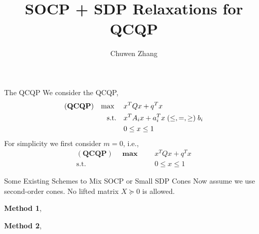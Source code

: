 \documentclass[aspectratio=1610, 10pt]{beamer}
\newcommand{\model}[1]{(\textbf{#1})}
\newcommand{\mx}{\mathbf{\max}\;}
\begin{document}
\title{SOCP + SDP Relaxations for QCQP}

\author{
  Chuwen Zhang
}


\maketitle
\begin{frame}{The QCQP}
  We consider the QCQP,
  \begin{equation}
    \label{eq:inhoqcqp}
    \begin{aligned}
      \model{QCQP} \quad \mx \quad & x^T Qx + q^T x                                    \\
      \textrm{s.t.} \quad          & x^T A_i x + a_i^T x \hspace{0.27em} (\le, =, \ge)
      \hspace{0.27em} b_i                                                              \\
                                   & 0 \le x \le 1
    \end{aligned}
  \end{equation}
  For simplicity we first consider \(m = 0\), i.e.,
  \begin{equation}
    \label{eq:inhoqcqp.box}
    \begin{aligned}
      \model{QCQP} \quad \mx \quad & x^T Qx + q^T x \\
      \textrm{s.t.} \quad          & 0 \le x \le 1
    \end{aligned}
  \end{equation}
\end{frame}
\begin{frame}[allowframebreaks]{Some Existing Schemes to Mix SOCP or Small SDP Cones}
  Now assume we use second-order cones. No lifted matrix \(X \succeq 0\) is allowed.

  \textbf{Method 1},

  \textbf{Method 2},

\end{frame}
\end{document}
